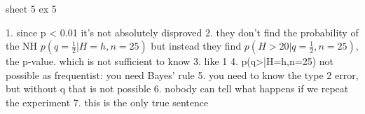 sheet 5 ex 5

1. since p < 0.01 it's not absolutely disproved
2. they don't find the probability of the NH $p(q=\frac{1}{2}|H=h,n=25)$ but instead they find $p(H>20|q=\frac{1}{2},n=25)$, the p-value. which is not sufficient to know 
3. like 1
4. p(q>|H=h,n=25) not possible as frequentist: you need Bayes' rule
5. you need to know the type 2 error, but without q that is not possible
6. nobody can tell what happens if we repeat the experiment
7. this is the only true sentence